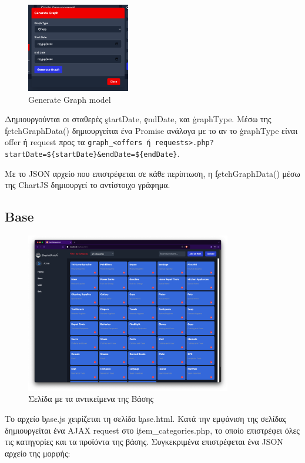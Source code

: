             \begin{figure}[H] \noindent \centering
                \includegraphics[width=0.4\textwidth]{img/admin-generate_graph}
                \caption{Generate Graph model}
            \end{figure}

            Δημιουργούνται οι σταθερές \c{startDate}, \c{endDate}, και \c{graphType}.
            Μέσω της \c{fetchGraphData()} δημιουργείται ένα Promise ανάλογα με το αν το \c{graphType} είναι offer ή request προς τα \verb|graph_<offers ή requests>.php?startDate=${startDate}&endDate=${endDate}|.

            Με το JSON αρχείο που επιστρέφεται σε κάθε περίπτωση, η \c{fetchGraphData()} μέσω της ChartJS δημιουργεί το αντίστοιχο γράφημα.

    \subsection{Base}
        \begin{figure}[H] \noindent \centering
            \includegraphics[width=0.8\textwidth]{img/admin-base}
            \caption{Σελίδα με τα αντικείμενα της Βάσης}
        \end{figure}

        Το αρχείο \c{base.js} χειρίζεται τη σελίδα \c{base.html}.
        Κατά την εμφάνιση της σελίδας δημιουργείται ένα AJAX request στο \c{item\_categories.php}, το οποίο επιστρέφει όλες τις κατηγορίες και τα προϊόντα της βάσης.
        Συγκεκριμένα επιστρέφεται ένα JSON αρχείο της μορφής:

